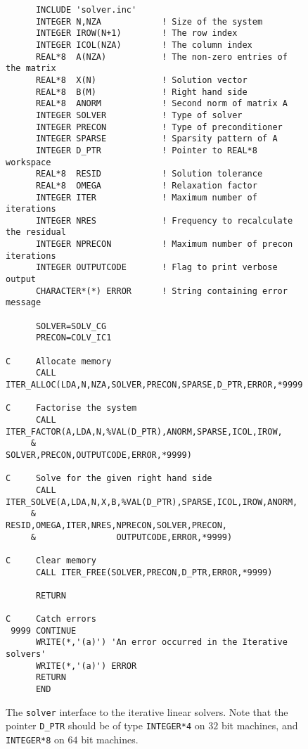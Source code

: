 \begin{figure}[htb]
\begin{small}
\begin{verbatim}
      INCLUDE 'solver.inc'
      INTEGER N,NZA            ! Size of the system
      INTEGER IROW(N+1)        ! The row index
      INTEGER ICOL(NZA)        ! The column index
      REAL*8  A(NZA)           ! The non-zero entries of the matrix
      REAL*8  X(N)             ! Solution vector
      REAL*8  B(M)             ! Right hand side
      REAL*8  ANORM            ! Second norm of matrix A
      INTEGER SOLVER           ! Type of solver
      INTEGER PRECON           ! Type of preconditioner
      INTEGER SPARSE           ! Sparsity pattern of A
      INTEGER D_PTR            ! Pointer to REAL*8 workspace
      REAL*8  RESID            ! Solution tolerance
      REAL*8  OMEGA            ! Relaxation factor
      INTEGER ITER             ! Maximum number of iterations
      INTEGER NRES             ! Frequency to recalculate the residual
      INTEGER NPRECON          ! Maximum number of precon iterations
      INTEGER OUTPUTCODE       ! Flag to print verbose output
      CHARACTER*(*) ERROR      ! String containing error message

      SOLVER=SOLV_CG
      PRECON=COLV_IC1

C     Allocate memory
      CALL ITER_ALLOC(LDA,N,NZA,SOLVER,PRECON,SPARSE,D_PTR,ERROR,*9999)

C     Factorise the system
      CALL ITER_FACTOR(A,LDA,N,%VAL(D_PTR),ANORM,SPARSE,ICOL,IROW,
     &                 SOLVER,PRECON,OUTPUTCODE,ERROR,*9999)

C     Solve for the given right hand side
      CALL ITER_SOLVE(A,LDA,N,X,B,%VAL(D_PTR),SPARSE,ICOL,IROW,ANORM,
     &                RESID,OMEGA,ITER,NRES,NPRECON,SOLVER,PRECON,
     &                OUTPUTCODE,ERROR,*9999)

C     Clear memory
      CALL ITER_FREE(SOLVER,PRECON,D_PTR,ERROR,*9999)

      RETURN

C     Catch errors
 9999 CONTINUE
      WRITE(*,'(a)') 'An error occurred in the Iterative solvers'
      WRITE(*,'(a)') ERROR
      RETURN
      END
\end{verbatim}
\end{small}
\caption{\label{f4.1} The {\tt solver} interface to the iterative linear
  solvers. Note that the pointer {\tt D\_PTR} should be of type {\tt INTEGER*4}
  on $32$ bit machines, and {\tt INTEGER*8} on $64$ bit machines.}
\end{figure}

